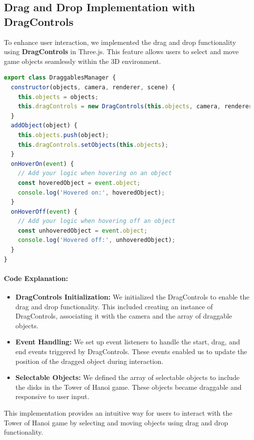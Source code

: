 \documentclass{article}
\begin{document}
\subsection{Drag and Drop Implementation with DragControls}
To enhance user interaction, we implemented the drag and drop functionality using \textbf{DragControls} in Three.js. This feature allows users to select and move game objects seamlessly within the 3D environment.
\begin{lstlisting}[language=JavaScript, caption={JS Class for Drag Control}]
export class DraggablesManager {
  constructor(objects, camera, renderer, scene) {
    this.objects = objects;
    this.dragControls = new DragControls(this.objects, camera, renderer.domElement)
  }
  addObject(object) {
    this.objects.push(object);
    this.dragControls.setObjects(this.objects);
  }
  onHoverOn(event) {
    // Add your logic when hovering on an object
    const hoveredObject = event.object;
    console.log('Hovered on:', hoveredObject);
  }
  onHoverOff(event) {
    // Add your logic when hovering off an object
    const unhoveredObject = event.object;
    console.log('Hovered off:', unhoveredObject);
  }
}
\end{lstlisting}
\newpage
\paragraph{Code Explanation:}
\begin{itemize}
    \item \textbf{DragControls Initialization:} We initialized the DragControls to enable the drag and drop functionality. This included creating an instance of DragControls, associating it with the camera and the array of draggable objects.

    \item \textbf{Event Handling:} We set up event listeners to handle the start, drag, and end events triggered by DragControls. These events enabled us to update the position of the dragged object during interaction.

    \item \textbf{Selectable Objects:} We defined the array of selectable objects to include the disks in the Tower of Hanoi game. These objects became draggable and responsive to user input.

\end{itemize}

This implementation provides an intuitive way for users to interact with the Tower of Hanoi game by selecting and moving objects using drag and drop functionality.
\end{document}
